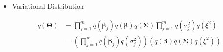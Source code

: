 \begin{appendix}
\begin{itemize}
\begin{equation}
\begin{split}
\log p(\bm{\Theta},\bm{y}, \bm{X})
&= \sum_{j=1}^{m} \log p\left(\bm{y}_j \mid \bm{\beta}_j, \sigma_j^2, \mathbf{X}_j \right) + \sum_{j=1}^{m} \log p\left(\bm{\beta}_j \mid \bm{\beta}, \bm{\Sigma}\right) + \log p(\bm{\beta})+\log p\left(\bm{\Sigma}\right) \\
&\quad + \sum_{j=1}^{m} \log p\left(\sigma^2_j\mid\xi^2\right) + \log p(\xi^2) \\
&= \sum_{j=1}^{m} \Bigg[
-\tfrac{n_j}{2}\log(2\pi) - \tfrac{n_j}{2}\log\sigma_j^2  -\tfrac{1}{2\sigma_j^2}
\big(\bm{y}_j-\mathbf{X}_j\bm{\beta}_j\big)^{\top}
\big(\bm{y}_j-\mathbf{X}_j\bm{\beta}_j\big)
\Bigg] \\
&\quad + \sum_{j=1}^{m} \Bigg[
-\tfrac{p}{2}\log(2\pi) -\tfrac{1}{2}\log|\bm{\Sigma}| -\tfrac{1}{2}\big(\bm{\beta}_j-\bm{\beta}\big)^{\top}\bm{\Sigma}^{-1}\big(\bm{\beta}_j-\bm{\beta}\big)
\Bigg] \\
&\quad + \Bigg[
-\tfrac{p}{2}\log(2\pi) -\tfrac{1}{2}\log|\bm{\Lambda_0}| -\tfrac{1}{2}\big(\bm{\beta}-\bm{\mu}_0\big)^{\top}\bm{\Lambda}_0^{-1}\big(\bm{\beta}-\bm{\mu}_0\big)
\Bigg]\\
&\quad + \Bigg[
\tfrac{n_0}{2}\log|\mathbf{S}_0| - \tfrac{n_0 p}{2}\log 2 - \log\Gamma_p\left(\tfrac{n_0}{2}\right)  -\tfrac{n_0+p+1}{2}\log|\bm{\Sigma}| -\tfrac{1}{2}\operatorname{tr}\left(\mathbf{S}_0\bm{\Sigma}^{-1}\right)
\Bigg] \\
&\quad + \sum_{j=1}^{m} \left[ \frac{\nu_0}{2}\log \frac{\nu_0\xi^2}{2} - \log\Gamma\left(\frac{\nu_0}{2}\right)  -\left(\frac{\nu_0}{2}+1\right)\log\sigma_j^2 - \tfrac{\nu_0\xi^2}{2\sigma_j^2}\right] \\
&\quad + \left[a_0\log b_0+(a_0-1)\log\xi^2-b_0\xi^2\right]
\end{split}
\end{equation}

\item Variational Distribution

\begin{equation}
\begin{split}
q(\bm{\Theta})&=\prod_{j=1}^{m}q(\bm{\beta}_j)q(\bm{\beta})q(\bm{\Sigma})\prod_{j=1}^{m}q(\sigma_j^2)q(\xi^2)\\
&= \left(\prod_{j=1}^{m}q(\bm{\beta}_j)q(\sigma_j^2)\right)\left(q(\bm{\beta})q(\bm{\Sigma})q(\xi^2)\right)
\end{split}
\end{equation}


\end{itemize}
\end{appendix}

